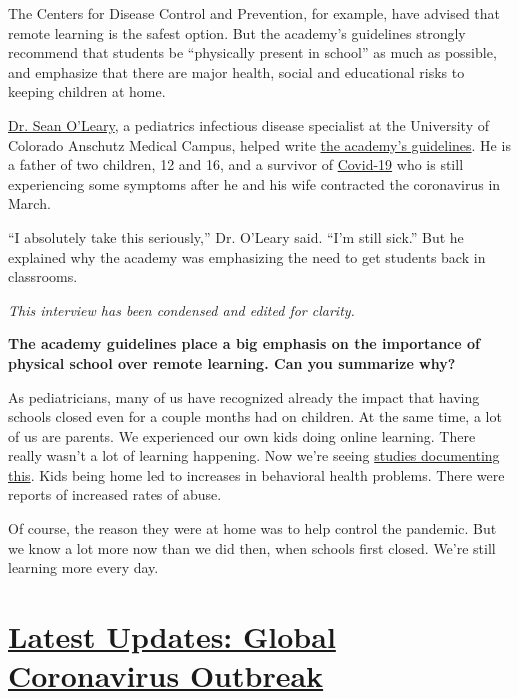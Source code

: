 The Centers for Disease Control and Prevention, for example, have
advised that remote learning is the safest option. But the academy's
guidelines strongly recommend that students be ``physically present in
school'' as much as possible, and emphasize that there are major health,
social and educational risks to keeping children at home.

\href{https://www.cudoctors.com/Find_A_Doctor/Profile/8599}{Dr. Sean
O'Leary}, a pediatrics infectious disease specialist at the University
of Colorado Anschutz Medical Campus, helped write
\href{https://services.aap.org/en/pages/2019-novel-coronavirus-covid-19-infections/clinical-guidance/covid-19-planning-considerations-return-to-in-person-education-in-schools/}{the
academy's guidelines}. He is a father of two children, 12 and 16, and a
survivor of
\href{https://www.nytimes3xbfgragh.onion/news-event/coronavirus}{Covid-19}
who is still experiencing some symptoms after he and his wife contracted
the coronavirus in March.

``I absolutely take this seriously,'' Dr. O'Leary said. ``I'm still
sick.'' But he explained why the academy was emphasizing the need to get
students back in classrooms.

\emph{This interview has been condensed and edited for clarity.}

\textbf{The academy guidelines place a big emphasis on the importance of
physical school over remote learning. Can you summarize why?}

As pediatricians, many of us have recognized already the impact that
having schools closed even for a couple months had on children. At the
same time, a lot of us are parents. We experienced our own kids doing
online learning. There really wasn't a lot of learning happening. Now
we're seeing
\href{https://www.nytimes3xbfgragh.onion/2020/06/05/us/coronavirus-education-lost-learning.html}{studies
documenting this}. Kids being home led to increases in behavioral health
problems. There were reports of increased rates of abuse.

Of course, the reason they were at home was to help control the
pandemic. But we know a lot more now than we did then, when schools
first closed. We're still learning more every day.

\hypertarget{latest-updates-global-coronavirus-outbreak}{%
\section{\texorpdfstring{\href{https://www.nytimes3xbfgragh.onion/2020/08/04/world/coronavirus-cases.html?action=click\&pgtype=Article\&state=default\&region=MAIN_CONTENT_1\&context=storylines_live_updates}{Latest
Updates: Global Coronavirus
Outbreak}}{Latest Updates: Global Coronavirus Outbreak}}\label{latest-updates-global-coronavirus-outbreak}}

